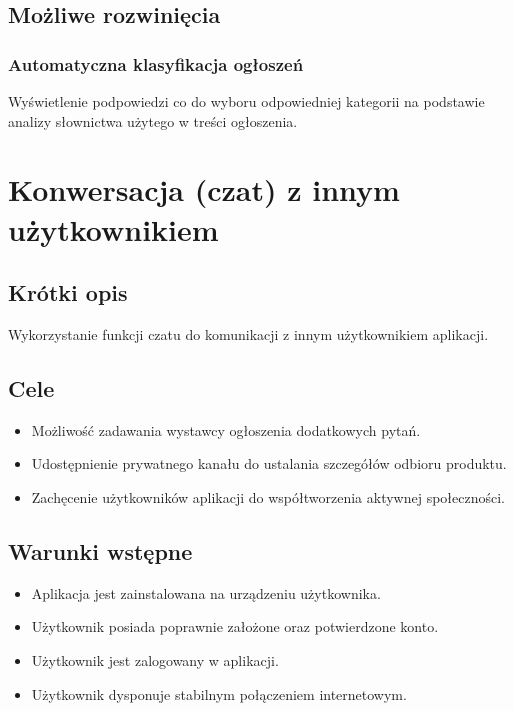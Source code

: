 \documentclass[12pt,a4paper,twoside]{article}
\begin{document}
    \subsection{Możliwe rozwinięcia}
    \subsubsection{Automatyczna klasyfikacja ogłoszeń}
    Wyświetlenie podpowiedzi co do wyboru odpowiedniej kategorii na podstawie analizy słownictwa użytego w treści ogłoszenia.


    \section{Konwersacja (czat) z innym użytkownikiem}


    \subsection{Krótki opis}
    Wykorzystanie funkcji czatu do komunikacji z innym użytkownikiem aplikacji.


    \subsection{Cele}
    \begin{itemize}
        \item Możliwość zadawania wystawcy ogłoszenia dodatkowych pytań.
        \item Udostępnienie prywatnego kanału do ustalania szczegółów odbioru produktu.
        \item Zachęcenie użytkowników aplikacji do współtworzenia aktywnej społeczności.
    \end{itemize}


    \subsection{Warunki wstępne}
    \begin{itemize}
        \item Aplikacja jest zainstalowana na urządzeniu użytkownika.
        \item Użytkownik posiada poprawnie założone oraz potwierdzone konto.
        \item Użytkownik jest zalogowany w aplikacji.
        \item Użytkownik dysponuje stabilnym połączeniem internetowym.
    \end{itemize}
\end{document}
